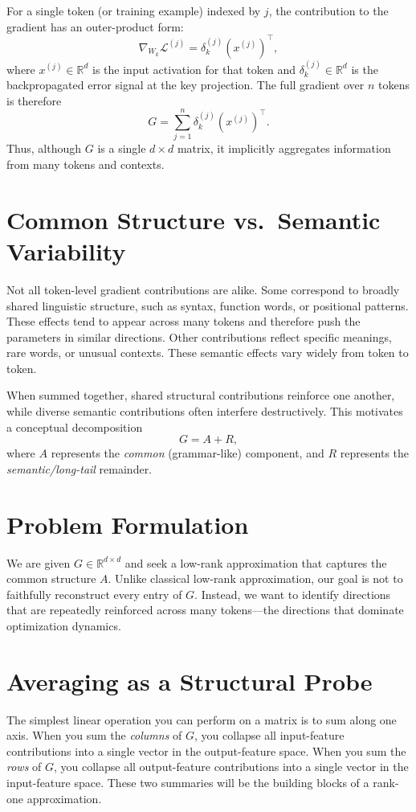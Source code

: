 \documentclass[11pt]{book}
\begin{document}
For a single token (or training example) indexed by $j$, the contribution to the
gradient has an outer-product form:
\[
\nabla_{W_k} \mathcal{L}^{(j)} = \delta_k^{(j)} (x^{(j)})^\top,
\]
where $x^{(j)} \in \mathbb{R}^d$ is the input activation for that token and
$\delta_k^{(j)} \in \mathbb{R}^d$ is the backpropagated error signal at the key
projection. The full gradient over $n$ tokens is therefore
\[
G = \sum_{j=1}^{n} \delta_k^{(j)} (x^{(j)})^\top.
\]
Thus, although $G$ is a single $d \times d$ matrix, it implicitly aggregates
information from many tokens and contexts.

\section{Common Structure vs.\ Semantic Variability}

Not all token-level gradient contributions are alike.
Some correspond to broadly shared linguistic structure, such as syntax,
function words, or positional patterns.
These effects tend to appear across many tokens and therefore push the parameters
in similar directions.
Other contributions reflect specific meanings, rare words, or unusual contexts.
These semantic effects vary widely from token to token.

When summed together, shared structural contributions reinforce one another,
while diverse semantic contributions often interfere destructively.
This motivates a conceptual decomposition
\[
G = A + R,
\]
where $A$ represents the \emph{common} (grammar-like) component, and $R$
represents the \emph{semantic/long-tail} remainder.

\section{Problem Formulation}

We are given $G \in \mathbb{R}^{d \times d}$ and seek a low-rank approximation that
captures the common structure $A$.
Unlike classical low-rank approximation, our goal is not to faithfully reconstruct
every entry of $G$. Instead, we want to identify directions that are repeatedly
reinforced across many tokens---the directions that dominate optimization dynamics.

\section{Averaging as a Structural Probe}

The simplest linear operation you can perform on a matrix is to sum along one axis.
When you sum the \emph{columns} of $G$, you collapse all input-feature contributions
into a single vector in the output-feature space. When you sum the \emph{rows} of $G$,
you collapse all output-feature contributions into a single vector in the input-feature space.
These two summaries will be the building blocks of a rank-one approximation.
\end{document}
